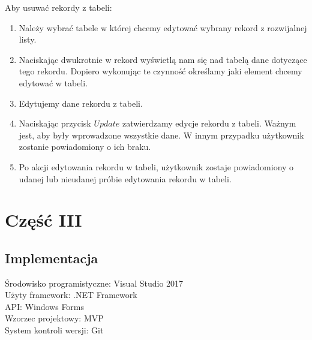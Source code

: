 \documentclass[12pt,a4paper]{article}
\begin{document}
    Aby usuwać rekordy z tabeli:
    \begin{enumerate}
        \item Należy wybrać tabele w której chcemy edytować wybrany rekord z rozwijalnej listy.
        \item Naciskając dwukrotnie w rekord wyświetlą nam się nad tabelą dane dotyczące tego rekordu. Dopiero wykonując te czynność określamy jaki element chcemy edytować w tabeli.
        \item Edytujemy dane rekordu z tabeli. 
        \item Naciskając przycisk $Update$ zatwierdzamy edycje rekordu z tabeli. Ważnym jest, aby były wprowadzone wszystkie dane. W innym przypadku użytkownik zostanie powiadomiony o ich braku.
        \item Po akcji edytowania rekordu w tabeli, użytkownik zostaje powiadomiony o udanej lub nieudanej próbie edytowania rekordu w tabeli.
    \end{enumerate}
    
    \newpage

    \section{Część III}
    \subsection{Implementacja}
    Środowisko programistyczne: Visual Studio 2017 \\
    Użyty framework: .NET Framework \\
    API: Windows Forms \\
    Wzorzec projektowy: MVP \\
    System kontroli wersji: Git \\
    
\end{document}
